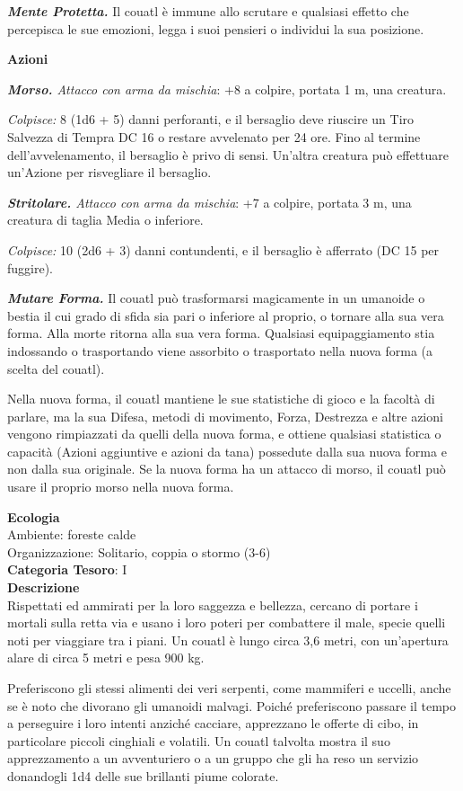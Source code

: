 \begin{multicols}{2}
{\emph{\textbf{Mente Protetta.}} Il couatl è immune allo scrutare e qualsiasi effetto che percepisca le sue emozioni, legga i suoi pensieri o individui la sua posizione.

\textbf{Azioni}

\emph{\textbf{Morso.} Attacco con arma da mischia}: +8 a colpire, portata 1 m, una creatura.

\emph{Colpisce:} 8 (1d6 + 5) danni perforanti, e il bersaglio deve riuscire un Tiro Salvezza di Tempra DC 16 o restare avvelenato per 24 ore. Fino al termine dell'avvelenamento, il bersaglio è privo di sensi. Un'altra creatura può effettuare un'Azione per risvegliare il bersaglio.

\emph{\textbf{Stritolare.} Attacco con arma da mischia}: +7 a colpire, portata 3 m, una creatura di taglia Media o inferiore.

\emph{Colpisce:} 10 (2d6 + 3) danni contundenti, e il bersaglio è afferrato (DC 15 per fuggire).

\emph{\textbf{Mutare Forma.}} Il couatl può trasformarsi magicamente in un umanoide o bestia il cui grado di sfida sia pari o inferiore al proprio, o tornare alla sua vera forma. Alla morte ritorna alla sua vera forma. Qualsiasi equipaggiamento stia indossando o trasportando viene assorbito o trasportato nella nuova forma (a scelta del couatl).

Nella nuova forma, il couatl mantiene le sue statistiche di gioco e la facoltà di parlare, ma la sua Difesa, metodi di movimento, Forza, Destrezza e altre azioni vengono rimpiazzati da quelli della nuova forma, e ottiene qualsiasi statistica o capacità (Azioni aggiuntive e azioni da tana) possedute dalla sua nuova forma e non dalla sua originale. Se la nuova forma ha un attacco di morso, il couatl può usare il proprio morso nella nuova forma.

\textbf{Ecologia}\\
Ambiente: foreste calde\\
Organizzazione: Solitario, coppia o stormo (3-6)\\
\textbf{Categoria Tesoro}: I\\
\textbf{Descrizione}\\
Rispettati ed ammirati per la loro saggezza e bellezza, cercano di portare i mortali sulla retta via e usano i loro poteri per combattere il male, specie quelli noti per viaggiare tra i piani. Un couatl è lungo circa 3,6 metri, con un'apertura alare di circa 5 metri e pesa 900 kg.

Preferiscono gli stessi alimenti dei veri serpenti, come mammiferi e uccelli, anche se è noto che divorano gli umanoidi malvagi. Poiché preferiscono passare il tempo a perseguire i loro intenti anziché cacciare, apprezzano le offerte di cibo, in particolare piccoli cinghiali e volatili. Un couatl talvolta mostra il suo apprezzamento a un avventuriero o a un gruppo che gli ha reso un servizio donandogli 1d4 delle sue brillanti piume colorate.

}
\end{multicols}

